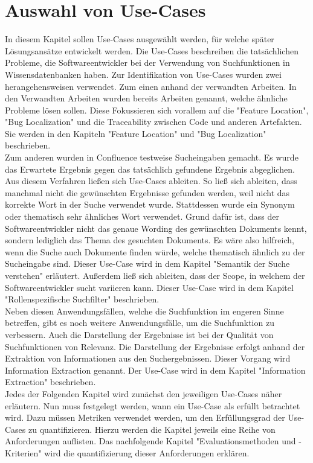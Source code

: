 \chapter{Auswahl von Use-Cases}
In diesem Kapitel sollen Use-Cases ausgewählt werden, für welche später Lösungsansätze entwickelt werden.
Die Use-Cases beschreiben die tatsächlichen Probleme, die Softwareentwickler bei der Verwendung von Suchfunktionen in Wissensdatenbanken haben.
Zur Identifikation von Use-Cases wurden zwei herangehensweisen verwendet.
Zum einen anhand der verwandten Arbeiten.
In den Verwandten Arbeiten wurden bereits Arbeiten genannt, welche ähnliche Probleme lösen sollen.
Diese Fokussieren sich vorallem auf die "Feature Location", "Bug Localization" und die Traceability zwischen Code und anderen Artefakten.
Sie werden in den Kapiteln "Feature Location" und "Bug Localization" beschrieben.\\

Zum anderen wurden in Confluence testweise Sucheingaben gemacht.
Es wurde das Erwartete Ergebnis gegen das tatsächlich gefundene Ergebnis abgeglichen.
Aus diesem Verfahren ließen sich Use-Cases ableiten.
So ließ sich ableiten, dass manchmal nicht die gewünschten Ergebnisse gefunden werden, weil nicht das korrekte Wort in der Suche verwendet wurde.
Stattdessen wurde ein Synonym oder thematisch sehr ähnliches Wort verwendet.
Grund dafür ist, dass der Softwareentwickler nicht das genaue Wording des gewünschten Dokuments kennt, sondern lediglich das Thema des gesuchten Dokuments.
Es wäre also hilfreich, wenn die Suche auch Dokumente finden würde, welche thematisch ähnlich zu der Sucheingabe sind.
Dieser Use-Case wird in dem Kapitel "Semantik der Suche verstehen" erläutert.
Außerdem ließ sich ableiten, dass der Scope, in welchem der Softwareentwickler sucht variieren kann.
Dieser Use-Case wird in dem Kapitel "Rollenspezifische Suchfilter" beschrieben.\\

Neben diesen Anwendungsfällen, welche die Suchfunktion im engeren Sinne betreffen, gibt es noch weitere Anwendungsfälle, um die Suchfunktion zu verbessern.
Auch die Darstellung der Ergebnisse ist bei der Qualität von Suchfunktionen von Relevanz.
Die Darstellung der Ergebnisse erfolgt anhand der Extraktion von Informationen aus den Suchergebnissen.
Dieser Vorgang wird Information Extraction genannt.
Der Use-Case wird in dem Kapitel "Information Extraction" beschrieben.\\

Jedes der Folgenden Kapitel wird zunächst den jeweiligen Use-Cases näher erläutern.
Nun muss festgelegt werden, wann ein Use-Case als erfüllt betrachtet wird.
Dazu müssen Metriken verwendet werden, um den Erfüllungsgrad der Use-Cases zu quantifizieren.
Hierzu werden die Kapitel jeweils eine Reihe von Anforderungen auflisten.
Das nachfolgende Kapitel "Evaluationsmethoden und -Kriterien" wird die quantifizierung dieser Anforderungen erklären. 

